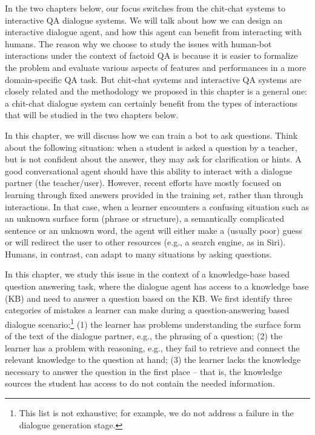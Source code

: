 In the two chapters below, 
our focus switches from the chit-chat systems to interactive QA dialogue systems.
We will talk about how we can 
design an interactive dialogue agent, and how this agent can benefit from interacting with humans. 
The reason why 
we choose to study the issues with human-bot interactions under the context of factoid QA is because it is
easier to formalize the problem and evaluate various aspects of features and performances in a more domain-specific QA task.
But  
chit-chat 
 systems and interactive QA systems are closely related and 
 the methodology we proposed in this chapter is a general one: 
a chit-chat dialogue system can certainly benefit from the  types of interactions that will be studied in the two chapters below. 

In this chapter, we will discuss how we can train a bot to ask questions. 
Think about the following situation: 
when a student is asked a question by a teacher, but is not confident about the answer, 
they may ask for clarification or hints.
A good conversational agent should have this ability to
interact with a dialogue partner (the teacher/user).
However,  recent efforts have mostly focused
 on learning through fixed answers provided in the training set,
rather than through interactions.
In that case, when a learner encounters a confusing situation such as an unknown surface form (phrase or structure),
a semantically complicated sentence or an unknown word, the agent will either make a (usually poor) guess or will
redirect the user to other resources (e.g., a search engine, as in Siri).
Humans, in contrast, can adapt to many situations by asking questions.

In this chapter, 
we study this issue in the context of a knowledge-base based question answering task, where the dialogue agent has access to a knowledge base (KB)
and need to answer a question based on the KB. 
We first identify
 three categories of mistakes a learner can make during 
a question-answering based
dialogue scenario:\footnote{This
list is not exhaustive; for example, we do not address a failure in the dialogue generation stage.}
(1) the learner has problems understanding the surface form of the text of the dialogue partner, e.g., the phrasing of a question;
(2) the learner has a problem 
with reasoning, e.g., they fail to retrieve and connect 
the relevant knowledge to the question at hand;
(3) the learner lacks the knowledge necessary to answer the question in the first place
-- that is,
the knowledge sources the student has access to do not contain the needed information.

